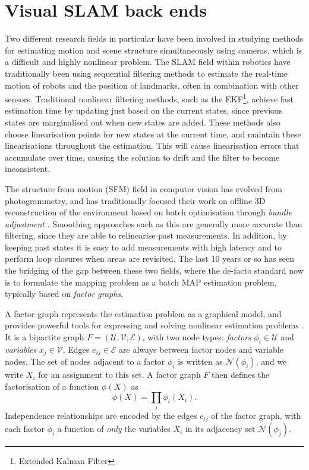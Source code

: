 \chapter{Visual SLAM back ends}
Two different research fields in particular have been involved in studying methods for estimating motion and scene structure simultaneously using cameras, which is a difficult and highly nonlinear problem.
The SLAM field within robotics have traditionally been using sequential filtering methods \cite{Thrun2002ProbabilisticRobotics} to estimate the real-time motion of robots and the position of landmarks, often in combination with other sensors.
Traditional nonlinear filtering methods, such as the EKF\footnote{Extended Kalman Filter}, achieve fast estimation time by updating just based on the current states, since previous states are marginalised out when new states are added.
These methods also choose linearisation points for new states at the current time, and maintain these linearisations throughout the estimation.
This will cause linearisation errors that accumulate over time, causing the solution to drift and the filter to become inconsistent.

The structure from motion (SFM) field in computer vision has evolved from photogrammetry, and has traditionally focused their work on offline 3D reconstruction of the environment based on batch optimisation through \textit{bundle adjustment} \cite{Triggs2000BundleSynthesis}.
Smoothing approaches such as this are generally more accurate than filtering, since they are able to relinearise past measurements.
In addition, by keeping past states it is easy to add measurements with high latency and to perform loop closures when areas are revisited.
The last 10 years or so has seen the bridging of the gap between these two fields, where the de-facto standard now is to formulate the mapping problem as a batch MAP estimation problem\cite{Strasdat2012VisualFilter, Cadena2016}, typically based on \textit{factor graphs}.

A factor graph represents the estimation problem as a graphical model, and provides powerful tools for expressing and solving nonlinear estimation problems \cite{Dellaert2017}.
It is a bipartite graph $F = (\mathcal{U}, \mathcal{V}, \mathcal{E})$, with two node types: \textit{factors} $\phi_i \in \mathcal{U}$ and \textit{variables} $x_j \in \mathcal{V}$.
Edges $e_{ij} \in \mathcal{E}$ are always between factor nodes and variable nodes.
The set of nodes adjacent to a factor $\phi_i$ is written as $\mathcal{N}(\phi_i)$, and we write $X_i$ for an assignment to this set.
A factor graph $F$ then defines the factorisation of a function $\phi(X)$ as
\begin{equation}
    \phi(X) = \prod_i{\phi_i(X_i)}. \label{eqn:factor}
\end{equation}
Independence relationships are encoded by the edges $e_{ij}$ of the factor graph, with each factor $\phi_i$ a function of \textit{only} the variables $X_i$ in its adjacency set $\mathcal{N}(\phi_j)$.

